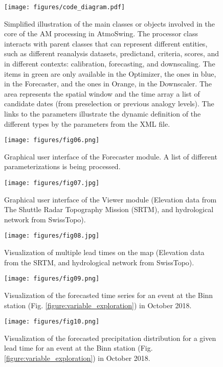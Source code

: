 \documentclass[review]{elsarticle}
\begin{document}
\begin{figure*}[t]
	\texttt{[image: figures/code\_diagram.pdf]}
	\caption{Simplified illustration of the main classes or objects involved in the core of the AM processing in AtmoSwing. The processor class interacts with parent classes that can represent different entities, such as different reanalysis datasets, predictand, criteria, scores, and in different contexts: calibration, forecasting, and downscaling. The items in green are only available in the Optimizer, the ones in blue, in the Forecaster, and the ones in Orange, in the Downscaler. The area represents the spatial window and the time array a list of candidate dates (from preselection or previous analogy levels). The links to the parameters illustrate the dynamic definition of the different types by the parameters from the XML file.}
	\label{figure:code_diagram}
\end{figure*}

\begin{figure}[t]
	\texttt{[image: figures/fig06.png]}
	\caption{Graphical user interface of the Forecaster module. A list of different parameterizations is being processed.}
	\label{figure:atmoswing-forecaster-gui}
\end{figure}

\begin{figure*}[t]
	\texttt{[image: figures/fig07.jpg]}
	\caption{Graphical user interface of the Viewer module (Elevation data from The Shuttle Radar Topography Mission (SRTM), and hydrological network from SwissTopo).}
	\label{figure:atmoswing-viewer-gui}
\end{figure*}

\begin{figure*}[t]
	\texttt{[image: figures/fig08.jpg]}
	\caption{Visualization of multiple lead times on the map (Elevation data from the SRTM, and hydrological network from SwissTopo).}
	\label{figure:atmoswing-viewer-snail}
\end{figure*}

\begin{figure}[t]
	\texttt{[image: figures/fig09.png]}
	\caption{Visualization of the forecasted time series for an event at the Binn station (Fig. \ref{figure:variable_exploration}) in October 2018.}
	\label{figure:atmoswing-viewer-timeseries}
\end{figure}

\begin{figure}[t]
	\texttt{[image: figures/fig10.png]}
	\caption{Visualization of the forecasted precipitation distribution for a given lead time for an event at the Binn station (Fig. \ref{figure:variable_exploration}) in October 2018.}
	\label{figure:atmoswing-viewer-distribution}
\end{figure}
\end{document}
